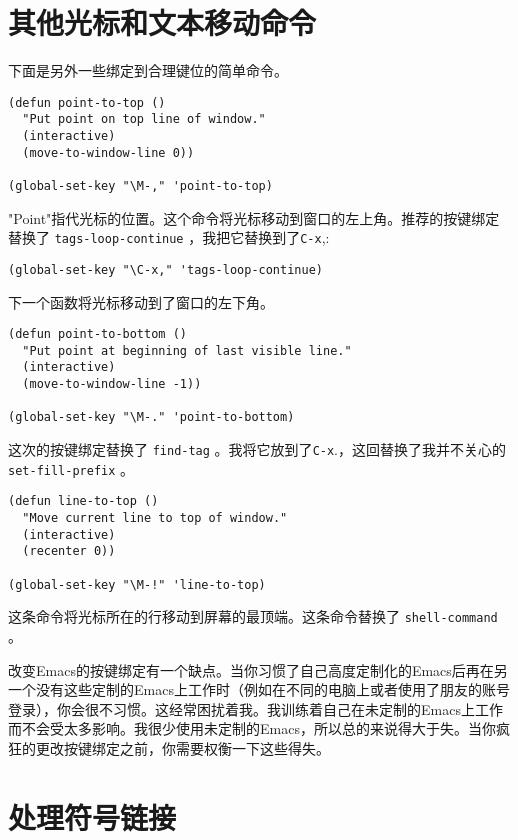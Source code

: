 \section{其他光标和文本移动命令}
\label{section:02-Other-Cursor-and-Text-Motion-Commands}

下面是另外一些绑定到合理键位的简单命令。

\begin{verbatim}
(defun point-to-top ()
  "Put point on top line of window."
  (interactive)
  (move-to-window-line 0))

(global-set-key "\M-," 'point-to-top)
\end{verbatim}

"Point"指代光标的位置。这个命令将光标移动到窗口的左上角。推荐的按键绑定替换了 \texttt{tags-loop-continue} ，我把它替换到了\verb|C-x|,:

\begin{verbatim}
(global-set-key "\C-x," 'tags-loop-continue)
\end{verbatim}

下一个函数将光标移动到了窗口的左下角。

\begin{verbatim}
(defun point-to-bottom ()
  "Put point at beginning of last visible line."
  (interactive)
  (move-to-window-line -1))

(global-set-key "\M-." 'point-to-bottom)
\end{verbatim}

这次的按键绑定替换了 \texttt{find-tag} 。我将它放到了\verb|C-x|.，这回替换了我并不关心的 \texttt{set-fill-prefix} 。

\begin{verbatim}
(defun line-to-top ()
  "Move current line to top of window."
  (interactive)
  (recenter 0))

(global-set-key "\M-!" 'line-to-top)
\end{verbatim}

这条命令将光标所在的行移动到屏幕的最顶端。这条命令替换了 \texttt{shell-command} 。

改变Emacs的按键绑定有一个缺点。当你习惯了自己高度定制化的Emacs后再在另一个没有这些定制的Emacs上工作时（例如在不同的电脑上或者使用了朋友的账号登录），你会很不习惯。这经常困扰着我。我训练着自己在未定制的Emacs上工作而不会受太多影响。我很少使用未定制的Emacs，所以总的来说得大于失。当你疯狂的更改按键绑定之前，你需要权衡一下这些得失。

\section{处理符号链接}
\label{section:02-Clobbering-Symbolic-Links}

